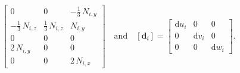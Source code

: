 \begin{subequations}
\begin{align}
\begin{bmatrix}
		0 &  0 & - \tfrac{1}{3} \,  N_{i,y}  \\
		-\tfrac{1}{3} \,  N_{i,z}   & \tfrac{1}{3} \,  N_{i,z}  &  N_{i,y}  \\
		0 &  0 & 0  \\
		2 \, N_{i,y} &  0 & 0  \\
		0 &  0 &  2 \,  N_{i,x}   \end{bmatrix}    \quad \text{and} \quad	[\mathbf{d}_i] = \begin{bmatrix}
		\mathrm{d} u_i & 0  & 0  \\
		0 &  \mathrm{d} v_i   & 0  \\
		0 & 0 & \mathrm{d} w_i \end{bmatrix} .
	\end{align}
\end{subequations}

